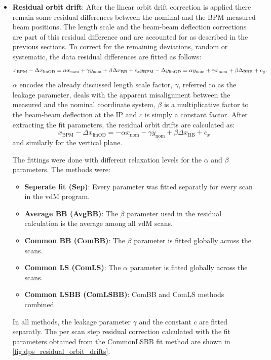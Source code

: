 \begin{itemize}
	\item \textbf{Residual orbit drift}: After the linear orbit drift correction is applied there remain some residual differences between the nominal and the BPM measured beam positions. The length scale and the beam-beam deflection corrections are part of this residual difference and are accounted for as described in the previous sections. To correct for the remaining deviations, random or systematic, the data residual differences are fitted as follows:
	\begin{equation}
		x_{\mathrm{BPM}} - \Delta x_{\mathrm{linOD}} = \alpha x_{\mathrm{nom}} + \gamma y_{\mathrm{nom}} + \beta \Delta x_{\mathrm{BB}} + c_x \\
		y_{\mathrm{BPM}} - \Delta y_{\mathrm{linOD}} = \alpha y_{\mathrm{nom}} + \gamma x_{\mathrm{nom}} + \beta \Delta y_{\mathrm{BB}} + c_y.
	\end{equation}
	$\alpha$ encodes the already discussed length scale factor, $\gamma$, referred to as the leakage parameter, deals with the apparent misalignment between the measured and the nominal coordinate system, $\beta$ is a multiplicative factor to the beam-beam deflection at the IP and $c$ is simply a constant factor. After extracting the fit parameters, the residual orbit drifts are calculated as:
	\begin{equation}
		x_{\mathrm{BPM}} - \Delta x_{\mathrm{linOD}} = - \alpha x_{\mathrm{nom}} - \gamma y_{\mathrm{nom}} + \beta \Delta x_{\mathrm{BB}} + c_x
	\end{equation}
	and similarly for the vertical plane.

	The fittings were done with different relaxation levels for the $\alpha$ and $\beta$ parameters. The methods were:
	\begin{itemize}
		\item \textbf{Seperate fit (Sep)}: Every parameter was fitted separatly for every scan in the vdM program.
		\item \textbf{Average BB (AvgBB)}: The $\beta$ parameter used in the residual calculation is the average among all vdM scans.
		\item \textbf{Common BB (ComBB)}: The $\beta$ parameter is fitted globally across the scans.
		\item \textbf{Common LS (ComLS)}: The $\alpha$ parameter is fitted globally across the scans.
		\item \textbf{Common LSBB (ComLSBB)}: ComBB and ComLS methods combined.
	\end{itemize}
	In all methods, the leakage parameter $\gamma$ and the constant $c$ are fitted separatly. The per scan step residual correction calculated with the fit parameters obtained from the CommonLSBB fit method are shown in \autoref{fig:dps_residual_orbit_drifts}.


\end{itemize}
